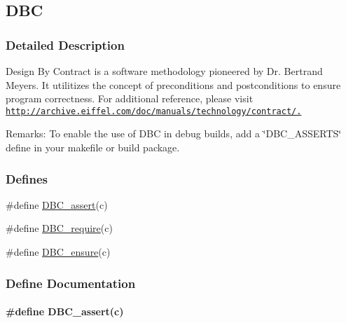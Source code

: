 \hypertarget{group___d_s_p_d_b_c}{
\subsection{DBC}
\label{group___d_s_p_d_b_c}
}


\subsubsection{Detailed Description}
Design By Contract is a software methodology pioneered by Dr. Bertrand Meyers. It utilitizes the concept of preconditions and postconditions to ensure program correctness. For additional reference, please visit \href{http://archive.eiffel.com/doc/manuals/technology/contract/.}{\tt http://archive.eiffel.com/doc/manuals/technology/contract/.}

\begin{Desc}
\item[Remarks:]To enable the use of DBC in debug builds, add a \char`\"{}DBC\_\-ASSERTS\char`\"{} define in your makefile or build package. \end{Desc}


\subsubsection*{Defines}
\begin{CompactItemize}
\item 
\#define \hyperlink{group___d_s_p_d_b_c_g6cdeaf48f645d45ed857a22b007e6cfe}{DBC\_\-assert}(c)
\item 
\#define \hyperlink{group___d_s_p_d_b_c_g7802e65c7b2332144847694c092e02e5}{DBC\_\-require}(c)
\item 
\#define \hyperlink{group___d_s_p_d_b_c_gbc8fbe5a1b7e7abb38b8a417da0a6746}{DBC\_\-ensure}(c)
\end{CompactItemize}


\subsubsection{Define Documentation}
\hypertarget{group___d_s_p_d_b_c_g6cdeaf48f645d45ed857a22b007e6cfe}{
\paragraph[DBC\_\-assert]{\setlength{\rightskip}{0pt plus 5cm}\#define DBC\_\-assert(c)}\hfill}
\label{group___d_s_p_d_b_c_g6cdeaf48f645d45ed857a22b007e6cfe}


